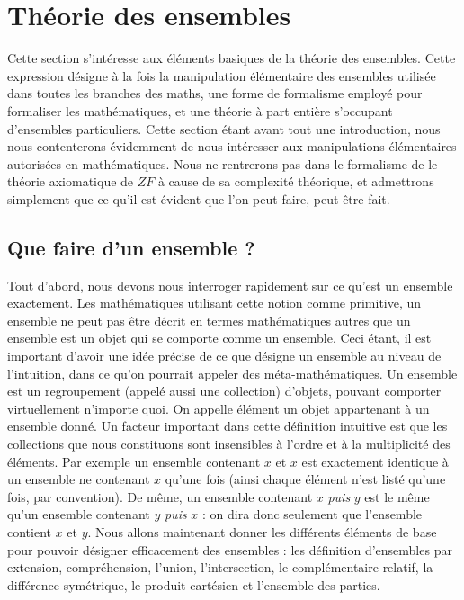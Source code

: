 \section{Théorie des ensembles}

Cette section s'intéresse aux éléments basiques de la théorie des ensembles. Cette expression désigne à la fois la manipulation élémentaire des ensembles utilisée dans toutes les branches des maths, une forme de formalisme employé pour formaliser les mathématiques, et une théorie à part entière s'occupant d'ensembles particuliers. Cette section étant avant tout une introduction, nous nous contenterons évidemment de nous intéresser aux manipulations élémentaires autorisées en mathématiques. Nous ne rentrerons pas dans le formalisme de le théorie axiomatique de $ZF$ à cause de sa complexité théorique, et admettrons simplement que ce qu'il est évident que l'on peut faire, peut être fait.

\subsection{Que faire d'un ensemble ?}

Tout d'abord, nous devons nous interroger rapidement sur ce qu'est un ensemble exactement. Les mathématiques utilisant cette notion comme primitive, un ensemble ne peut pas être décrit en termes mathématiques autres que \og un ensemble est un objet qui se comporte comme un ensemble\fg{}. Ceci étant, il est important d'avoir une idée précise de ce que désigne un ensemble au niveau de l'intuition, dans ce qu'on pourrait appeler des méta-mathématiques. Un ensemble est un regroupement (appelé aussi une collection) d'objets, pouvant comporter virtuellement n'importe quoi. On appelle \og élément\fg{} un objet appartenant à un ensemble donné. Un facteur important dans cette définition intuitive est que les collections que nous constituons sont insensibles à l'ordre et à la multiplicité des éléments. Par exemple un ensemble contenant $x$ et $x$ est exactement identique à un ensemble ne contenant $x$ qu'une fois (ainsi chaque élément n'est listé qu'une fois, par convention). De même, un ensemble contenant $x$ \textit{puis} $y$ est le même qu'un ensemble contenant $y$ \textit{puis} $x$ : on dira donc seulement que l'ensemble contient $x$ et $y$. Nous allons maintenant donner les différents éléments de base pour pouvoir désigner efficacement des ensembles : les définition d'ensembles par extension, compréhension, l'union, l'intersection, le complémentaire relatif, la différence symétrique, le produit cartésien et l'ensemble des parties.

